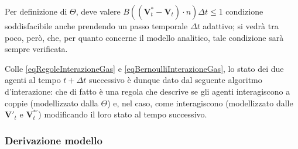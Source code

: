                 \begin{oss}
                    \label{ossCondizioneTetaGas}
                    Per definizione di \(\Theta\), deve valere \(B((\mathbf V^*_t-\mathbf V_t)\cdot n)\Delta t\le1\) condizione soddisfacibile anche prendendo un passo temporale \(\Delta t\) adattivo; si vedrà tra poco, però, che, per quanto concerne il modello analitico, tale condizione sarà sempre verificata.
                \end{oss}

                Colle \ref{eqRegoleInterazioneGas} e \ref{eqBernoulliInterazioneGas}, lo stato dei due agenti al tempo \(t+\Delta t\) successivo è dunque dato dal seguente algoritmo d'interazione:
                che di fatto è una regola che descrive se gli agenti interagiscono a coppie (modellizzato dalla \(\Theta\)) e, nel caso, come interagiscono (modellizzato dalle \(\mathbf V'_t\) e \(\mathbf V^{*\prime}_t\)) modificando il loro stato al tempo successivo.

            \subsubsection{Derivazione modello}

